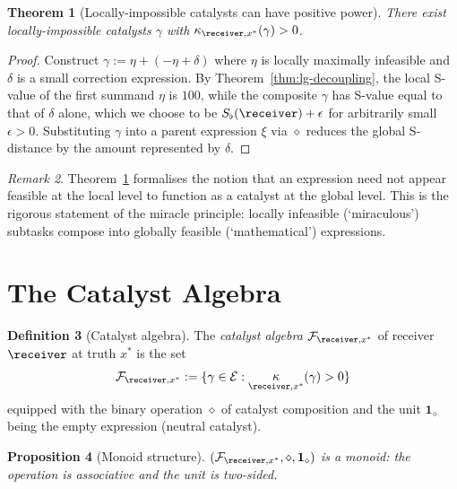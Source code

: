 \documentclass[11pt,a4paper]{article}
\theoremstyle{thmstyle}
\newtheorem{theorem}{Theorem}[section]
\newtheorem{proposition}[theorem]{Proposition}
\theoremstyle{thmstyle}
\theoremstyle{definition}
\newtheorem{definition}[theorem]{Definition}
\theoremstyle{remark}
\newtheorem{remark}[theorem]{Remark}
\DeclareMathOperator{\catpow}{\kappa}
\newcommand{\Expr}{\mathcal{E}}
\newcommand{\Frame}{\mathcal{F}}
\newcommand{\Sfloor}{S_{\flat}}
\begin{document}
\begin{theorem}[Locally-impossible catalysts can have
positive power]\label{thm:loc-imp-positive}
There exist locally-impossible catalysts $\gamma$ with
$\catpow_{\receiver, x^{*}}(\gamma) > 0$.
\end{theorem}

\begin{proof}
Construct $\gamma := \eta + (-\eta + \delta)$ where
$\eta$ is locally maximally infeasible and
$\delta$ is a small correction expression.  By
Theorem~\ref{thm:lg-decoupling}, the local S-value of
the first summand $\eta$ is $100$, while the
composite $\gamma$ has S-value equal to that of
$\delta$ alone, which we choose to be
$\Sfloor(\receiver) + \epsilon$ for arbitrarily small
$\epsilon > 0$.  Substituting $\gamma$ into a parent
expression $\xi$ via $\diamond$ reduces the global
S-distance by the amount represented by $\delta$.
\end{proof}

\begin{remark}\label{rem:miracle-as-catalyst}
Theorem~\ref{thm:loc-imp-positive} formalises the
notion that an expression need not appear feasible
at the local level to function as a catalyst at the
global level.  This is the rigorous statement of the
miracle principle: locally infeasible (`miraculous')
subtasks compose into globally feasible (`mathematical')
expressions.
\end{remark}

\section{The Catalyst Algebra}
\label{sec:catalyst-algebra}

\begin{definition}[Catalyst algebra]\label{def:cat-algebra}
The \emph{catalyst algebra} $\Frame_{\receiver, x^{*}}$
of receiver $\receiver$ at truth $x^{*}$ is the set
\[
\Frame_{\receiver, x^{*}}
:= \{\gamma \in \Expr : \catpow_{\receiver, x^{*}}(\gamma) > 0\}
\]
equipped with the binary operation $\diamond$ of
catalyst composition and the unit
$\mathbf{1}_{\diamond}$ being the empty expression
(neutral catalyst).
\end{definition}

\begin{proposition}[Monoid structure]\label{prop:monoid}
$(\Frame_{\receiver, x^{*}}, \diamond,
\mathbf{1}_{\diamond})$ is a monoid: the operation
is associative and the unit is two-sided.
\end{proposition}
\end{document}
